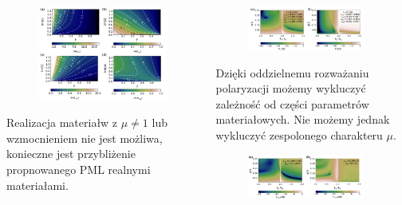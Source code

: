 \documentclass{beamer}
\begin{document}
\begin{frame} [t]
	\begin{columns}
		\begin{column}{0.5\textwidth}
			\begin{figure}
						\includegraphics[width=\textwidth]{../images/pml/oqe_materials.png}
			\end{figure}
			Realizacja materiałw z  $\mu \ne 1$ lub wzmocnieniem nie jest możliwa, konieczne jest przybliżenie propnowanego PML realnymi materiałami.			
		\end{column}
		\begin{column}{0.6\textwidth}
			\begin{figure}
						\includegraphics[width=0.9\textwidth]{../images/pml/oqe_reflection_kat.png}\\
			\end{figure}
				
		{\tiny	Dzięki oddzielnemu rozważaniu polaryzacji możemy wykluczyć zależność od części parametrów materiałowych. Nie możemy jednak wykluczyć zespolonego charakteru $\mu$.}

			\begin{figure}
						\includegraphics[width=0.9\textwidth]{../images/pml/oqe_reflection_kat_simp.png}
			\end{figure}


\end{column}
\end{columns}
\end{frame}
\end{document}
